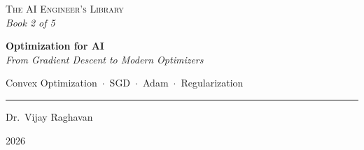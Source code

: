 \documentclass[../main.tex]{subfiles}
\begin{document}
\begin{titlepage}
\centering

\vspace*{1cm}
{\large\scshape The AI Engineer's Library}\\[0.3cm]
{\normalsize\itshape Book 2 of 5}

\vspace{2cm}

{\Huge\bfseries Optimization for AI}\\[0.8cm]
{\Large\itshape From Gradient Descent to Modern Optimizers}

\vspace{1.5cm}

{\large
Convex Optimization~$\cdot$~SGD~$\cdot$~Adam~$\cdot$~Regularization
}

\vfill

\rule{0.6\textwidth}{0.4pt}

\vspace{1cm}

{\Large Dr.\ Vijay Raghavan}

\vspace{1.5cm}

{\large 2026}

\end{titlepage}
\end{document}
